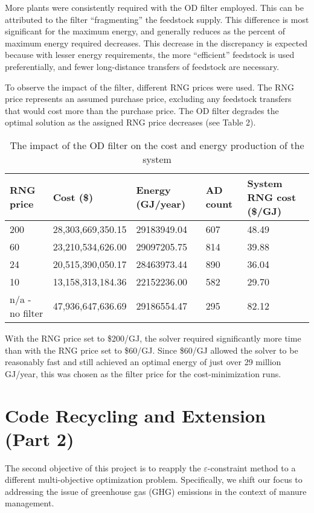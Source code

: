 \documentclass[12pt]{article}
\begin{document}
More plants were consistently required with the OD filter employed. This can be attributed to the filter “fragmenting” the feedstock supply. This difference is most significant for the maximum energy, and generally reduces as the percent of maximum energy required decreases. This decrease in the discrepancy is expected because with lesser energy requirements, the more “efficient” feedstock is used preferentially, and fewer long-distance transfers of feedstock are necessary. 

To observe the impact of the filter, different RNG prices were used. The RNG price represents an assumed purchase price, excluding any feedstock transfers that would cost more than the purchase price. The OD filter degrades the optimal solution as the assigned RNG price decreases (see Table 2).

\begin{table}[h]
  \centering
  \begin{tabular}{|p{3cm} | p{3cm} | p{3cm}| p{3cm}| p{3cm}|}
  \hline
  \rowcolor{gray!30}
  RNG price & Cost (\$) & Energy (GJ/year) & AD count & System RNG cost (\$/GJ) \\ \hline
  200 & 28,303,669,350.15 & 29183949.04 & 607 & 48.49 \\ \hline
  60 & 23,210,534,626.00 & 29097205.75 & 814 & 39.88 \\ \hline
  24 & 20,515,390,050.17 & 28463973.44 & 890 & 36.04 \\ \hline
  10 & 13,158,313,184.36 & 22152236.00 & 582 & 29.70 \\ \hline
  n/a - no filter & 47,936,647,636.69 & 29186554.47 & 295 & 82.12 \\ \hline
  \end{tabular}
  \caption{The impact of the OD filter on the cost and energy production of the system}
\end{table}

With the RNG price set to \$200/GJ, the solver required significantly more time than with the RNG price set to \$60/GJ. Since \$60/GJ allowed the solver to be reasonably fast and still achieved an optimal energy of just over 29 million GJ/year, this was chosen as the filter price for the cost-minimization runs.


\section{Code Recycling and Extension (Part 2)}
The second objective of this project is to reapply the $\varepsilon$-constraint method to a different multi-objective optimization problem. Specifically, we shift our focus to addressing the issue of greenhouse gas (GHG) emissions in the context of manure management.
\end{document}
